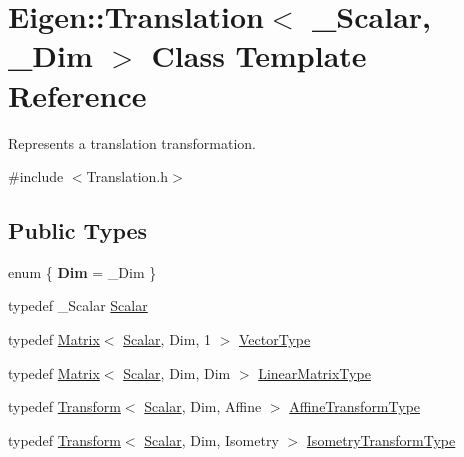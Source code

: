 \hypertarget{class_eigen_1_1_translation}{}\section{Eigen\+::Translation$<$ \+\_\+\+Scalar, \+\_\+\+Dim $>$ Class Template Reference}
\label{class_eigen_1_1_translation}


Represents a translation transformation.  




{\ttfamily \#include $<$Translation.\+h$>$}

\subsection*{Public Types}
\begin{DoxyCompactItemize}
\item 
enum \{ {\bfseries Dim} = \+\_\+\+Dim
 \}
\item 
typedef \+\_\+\+Scalar \mbox{\hyperlink{class_eigen_1_1_translation_ad596bf21ced4b902cc242205df486e21}{Scalar}}
\item 
typedef \mbox{\hyperlink{class_eigen_1_1_matrix}{Matrix}}$<$ \mbox{\hyperlink{class_eigen_1_1_translation_ad596bf21ced4b902cc242205df486e21}{Scalar}}, Dim, 1 $>$ \mbox{\hyperlink{class_eigen_1_1_translation_a339e17dfec5394ae563f62cca0df451f}{Vector\+Type}}
\item 
typedef \mbox{\hyperlink{class_eigen_1_1_matrix}{Matrix}}$<$ \mbox{\hyperlink{class_eigen_1_1_translation_ad596bf21ced4b902cc242205df486e21}{Scalar}}, Dim, Dim $>$ \mbox{\hyperlink{class_eigen_1_1_translation_ac5aca3bc67564e96ad550aba971de8b6}{Linear\+Matrix\+Type}}
\item 
typedef \mbox{\hyperlink{class_eigen_1_1_transform}{Transform}}$<$ \mbox{\hyperlink{class_eigen_1_1_translation_ad596bf21ced4b902cc242205df486e21}{Scalar}}, Dim, Affine $>$ \mbox{\hyperlink{class_eigen_1_1_translation_a25c762409320ba9490a0d12c6652bbad}{Affine\+Transform\+Type}}
\item 
typedef \mbox{\hyperlink{class_eigen_1_1_transform}{Transform}}$<$ \mbox{\hyperlink{class_eigen_1_1_translation_ad596bf21ced4b902cc242205df486e21}{Scalar}}, Dim, Isometry $>$ \mbox{\hyperlink{class_eigen_1_1_translation_ad3ac890d85420ba78e16dab1983d1a80}{Isometry\+Transform\+Type}}
\end{DoxyCompactItemize}
